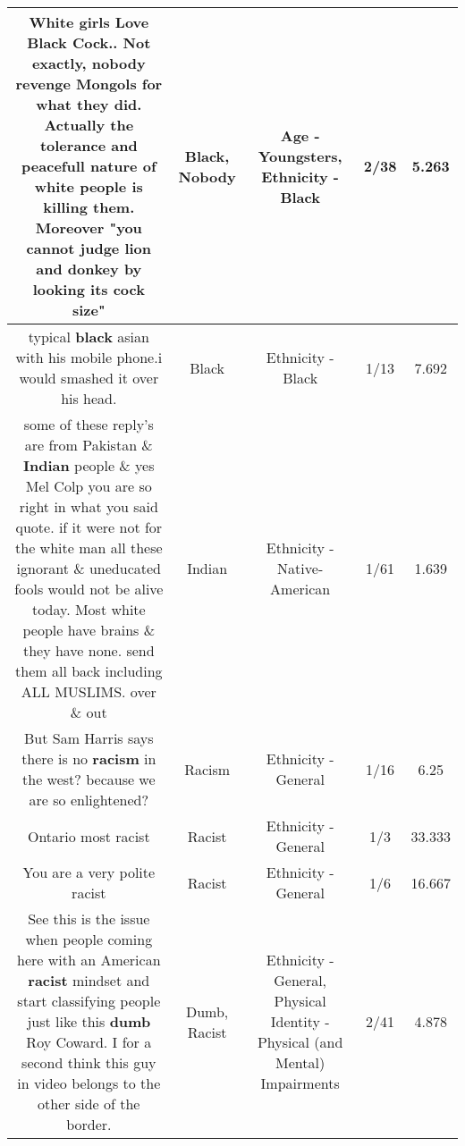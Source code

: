 \documentclass[11pt]{article}
\newlength\mylength
\begin{document}
\begin{center}
\begin{longtable}{|C{.65\mylength}|C{.30\mylength}|C{.12\mylength}|C{.12\mylength}|C{.12\mylength}|}
  \small White girls Love \textbf{Black} Cock.. Not exactly, \textbf{nobody} revenge Mongols for what they did. Actually the tolerance and peacefull nature of white people is killing them. Moreover "you cannot judge lion and donkey by looking its cock size"\normalsize   & Black, Nobody & Age - Youngsters, Ethnicity - Black & 2/38 & 5.263 \\  \hline
  \small typical  \textbf{black} asian with his mobile phone.i would smashed it over his head.\normalsize   & Black & Ethnicity - Black & 1/13 & 7.692 \\  \hline
  \small some of these reply's are from Pakistan \& \textbf{Indian} people \& yes Mel Colp you are so right in what you said quote. if it were not for the white man all these ignorant \& uneducated fools would not be alive today. Most white people have brains \& they have none. send them all back including ALL MUSLIMS. over \& out\normalsize   & Indian & Ethnicity - Native-American & 1/61 & 1.639 \\  \hline
  \small But Sam Harris says there is no \textbf{racism} in the west? because we are so enlightened?\normalsize   & Racism & Ethnicity - General & 1/16 & 6.25 \\  \hline
  \small Ontario most racist\normalsize   & Racist & Ethnicity - General & 1/3 & 33.333 \\  \hline
  \small You are a very polite racist\normalsize   & Racist & Ethnicity - General & 1/6 & 16.667 \\  \hline
  \small See this is the issue when people coming here with an American \textbf{racist} mindset and start classifying people just like this \textbf{dumb} Roy Coward. I for a second think this guy in video belongs to the other side of the border.\normalsize   & Dumb, Racist & Ethnicity - General, Physical Identity - Physical (and Mental) Impairments & 2/41 & 4.878 \\  \hline

\end{longtable}
\end{center}
\end{document}

